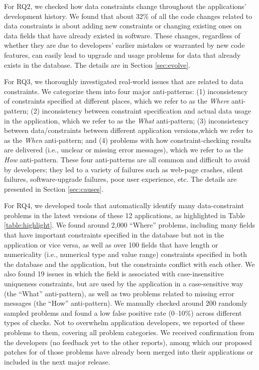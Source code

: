 {For RQ2}, we checked how data constraints change throughout the applications' development history. 
We found that about 32\% of all the code changes related to data constraints is about adding new constraints or changing existing ones on data fields that have already existed in software. These changes, regardless of whether they are due to developers' earlier mistakes or warranted by new code features, can easily lead to upgrade and usage problems for data that already exists in the database.
The details are in Section \ref{sec:evolve}.
 
{For RQ3}, we thoroughly investigated \numissues real-world issues that are related to data constraints. We categorize them into four major anti-patterns:
(1) inconsistency of constraints specified at different places, which we refer to as the {\it Where} anti-pattern;
(2) inconsistency between constraint specification and actual data usage in the application, which we refer to as the {\it What} anti-pattern;
(3) inconsistency between data/constraints between different application versions,which we refer to as the {\it When} anti-pattern;
and (4) problems with how constraint-checking results are
delivered (i.e., unclear or missing error messages), which
we refer to as the {\it How} anti-pattern. These four anti-patterns are all common and difficult to avoid by developers; they led to a variety of failures such as web-page crashes, silent failures, software-upgrade failures, poor user experience, etc.   
The details are presented in Section \ref{sec:causes}.

{For RQ4}, we developed tools that automatically identify many
data-constraint problems in the latest versions of these 12 applications, as highlighted in Table \ref{table:highlight}.  
We found around 2,000
``Where'' problems, including many fields
that have important constraints specified in the database
but not in the application or vice versa, as well as
over 100 fields that have length or numericality (i.e., numerical type and value range)
constraints specified in both the database and the application, 
but the constraints conflict with each other. We also found 19
issues in which the field is associated with case-insensitive uniqueness constraints, 
but are used by the application in a case-sensitive way
(the ``What'' anti-pattern), as well as
two problems related to missing error messages (the ``How'' anti-pattern).
We manually checked around 200 randomly sampled problems and found a low
false positive rate (0--10\%) across different types of checks. 
Not to overwhelm application developers, 
we reported \numreportedissues of these problems to them, covering all problem categories. We received \numconfirmedissues confirmation from the developers (no feedback yet to the other \numunconfirmedissues reports), among which our proposed patches for \nummergedissues of those problems have already been merged into their applications or included in the next major release. 


